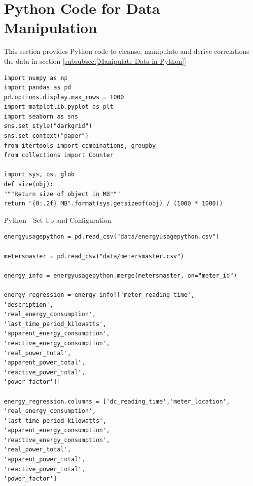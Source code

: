 \documentclass[12pt]{scrartcl}
\begin{document}
\section{Python Code for Data Manipulation}
\label{sec:[Python Code]}
This section provides Python code to cleanse, manipulate and derive correlations the data in section \ref{subsubsec:[Manipulate Data in Python]}

\begin{listing}
\begin{verbatim}
import numpy as np
import pandas as pd
pd.options.display.max_rows = 1000
import matplotlib.pyplot as plt
import seaborn as sns
sns.set_style("darkgrid")
sns.set_context("paper")
from itertools import combinations, groupby
from collections import Counter

import sys, os, glob
def size(obj):
"""Return size of object in MB"""
return "{0:.2f} MB".format(sys.getsizeof(obj) / (1000 * 1000))
\end{verbatim}
\caption{Python - Set Up and Configuration}
\label{list:[Python - Set up and Configuration]}
\end{listing}

\begin{lstlisting}[frame=single,basicstyle=\footnotesize\ttfamily,
  caption={Python - Import and Cleanse Energy Data},label={list:[Import and Merge Data]}]
energyusagepython = pd.read_csv("data/energyusagepython.csv")

metersmaster = pd.read_csv("data/metersmaster.csv")

energy_info = energyusagepython.merge(metersmaster, on="meter_id")

energy_regression = energy_info[['meter_reading_time',
'description',
'real_energy_consumption',
'last_time_period_kilowatts',
'apparent_energy_consumption',
'reactive_energy_consumption',
'real_power_total',
'apparent_power_total',
'reactive_power_total',
'power_factor']]

energy_regression.columns = ['dc_reading_time','meter_location',
'real_energy_consumption',
'last_time_period_kilowatts',
'apparent_energy_consumption',
'reactive_energy_consumption',
'real_power_total',
'apparent_power_total',
'reactive_power_total',
'power_factor']

\end{lstlisting}
\end{document}
